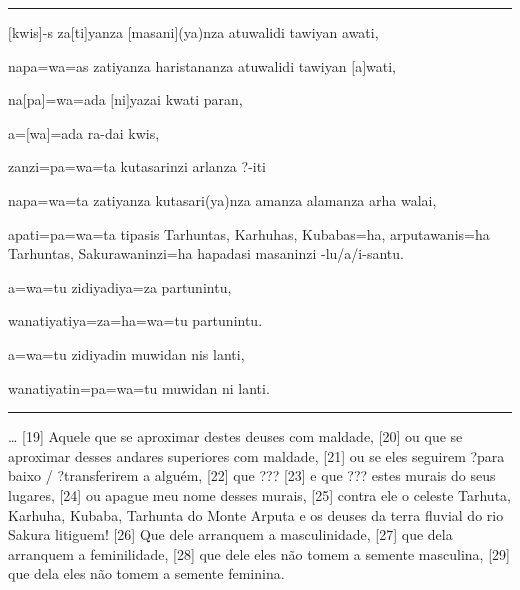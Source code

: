 \vspace{10pt}
\hrule
\vspace{10pt}


\setcounter{parcount}{18}
\begin{parnumbersa}[]

	\raggedright%
	\itshape%



	$[$kwis$]$-s za$[$ti$]$yanza $[$masani$]${(ya)}nza atuwalidi
	tawiyan awati,

	napa=wa=as zatiyanza haristananza atuwalidi tawiyan $[$a$]$wati,

	na$[$pa$]$=wa=ada $[$ni$]$yazai kwati paran,

	a=$[$wa$]$=ada ra-dai kwis,

	zanzi=pa=wa=ta kutasarinzi arlanza {?}-iti

	napa=wa=ta zatiyanza kutasari{(ya)}nza amanza alamanza arha walai,

	apati=pa=wa=ta tipasis Tarhuntas, Karhuhas, Kubabas=ha, arputawanis=ha
	Tarhuntas, Sakurawaninzi=ha hapadasi masaninzi -lu/a/i-santu.

	a=wa=tu zidiyadiya=za partunintu,

	wanatiyatiya=za=ha=wa=tu partunintu.

	a=wa=tu zidiyadin muwidan nis lanti,

	wanatiyatin=pa=wa=tu muwidan ni lanti.

\end{parnumbersa}

\vspace{10pt}
\hrule
\vspace{10pt}



\ldots{}
[19] Aquele que se aproximar destes deuses com maldade,
[20] ou que se aproximar desses andares superiores com maldade,
[21] ou se eles seguirem {?}para baixo / {?}transferirem a alguém,
[22] que {???}
	[23] e que {???} estes murais do seus lugares,
[24] ou apague meu nome desses murais,
[25] contra ele o celeste Tarhuta, Karhuha, Kubaba, Tarhunta do Monte Arputa e
os deuses da terra fluvial do rio Sakura litiguem!
[26] Que dele arranquem a masculinidade,
[27] que dela arranquem a feminilidade,
[28] que dele eles não tomem a semente masculina,
[29] que dela eles não tomem a semente feminina.

\clearpage

